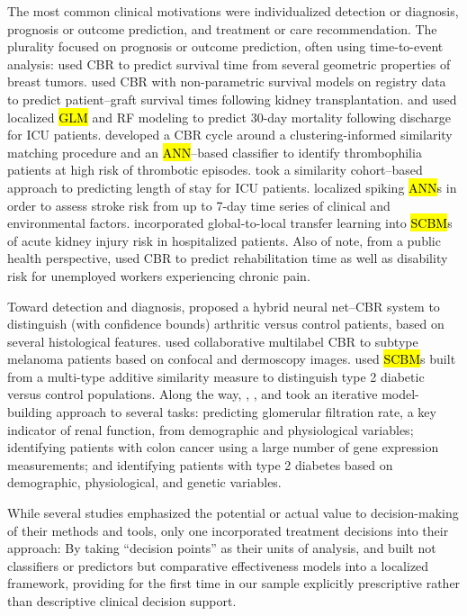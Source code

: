 \documentclass[sn-mathphys,Numbered,pdflatex]{sn-jnl}
\theoremstyle{remark}
\theoremstyle{definition}
\begin{document}
The most common clinical motivations were individualized detection or
diagnosis, prognosis or outcome prediction, and treatment or care
recommendation. The plurality focused on prognosis or outcome
prediction, often using time-to-event analysis: \citet{Mariuzzi1997}
used CBR to predict survival time from several geometric properties of
breast tumors. \citet{Lowsky2013} used CBR with non-parametric survival
models on registry data to predict patient--graft survival times
following kidney transplantation. \citet{Lee2015} and \citet{Lee2017}
used localized \hl{GLM} and RF modeling to predict 30-day mortality
following discharge for ICU patients. \citet{Vilhena2016} developed a
CBR cycle around a clustering-informed similarity matching procedure and
an \hl{ANN}--based classifier to identify thrombophilia patients at high
risk of thrombotic episodes. \citet{Ma2020} took a similarity
cohort--based approach to predicting length of stay for ICU patients.
\citet{Doborjeh2022} localized spiking \hl{ANN}s in order to assess
stroke risk from up to 7-day time series of clinical and environmental
factors. \citet{Liu2022} incorporated global-to-local transfer learning
into \hl{SCBM}s of acute kidney injury risk in hospitalized patients.
Also of note, from a public health perspective, \citet{Xu2008} used CBR
to predict rehabilitation time as well as disability risk for unemployed
workers experiencing chronic pain.

Toward detection and diagnosis, \citet{Wyns2004} proposed a hybrid
neural net--CBR system to distinguish (with confidence bounds) arthritic
versus control patients, based on several histological features.
\citet{Nicolas2014} used collaborative multilabel CBR to subtype
melanoma patients based on confocal and dermoscopy images.
\citet{Wang2019} used \hl{SCBM}s built from a multi-type additive
similarity measure to distinguish type 2 diabetic versus control
populations. Along the way, \citet{Song2006}, \citet{Kasabov2010}, and
\citet{Verma2015} took an iterative model-building approach to several
tasks: predicting glomerular filtration rate, a key indicator of renal
function, from demographic and physiological variables; identifying
patients with colon cancer using a large number of gene expression
measurements; and identifying patients with type 2 diabetes based on
demographic, physiological, and genetic variables.

While several studies emphasized the potential or actual value to
decision-making of their methods and tools, only one incorporated
treatment decisions into their approach: By taking ``decision points''
as their units of analysis, \citet{Tang2021} and \citet{Ng2021} built
not classifiers or predictors but comparative effectiveness models into
a localized framework, providing for the first time in our sample
explicitly prescriptive rather than descriptive clinical decision
support.
\end{document}

